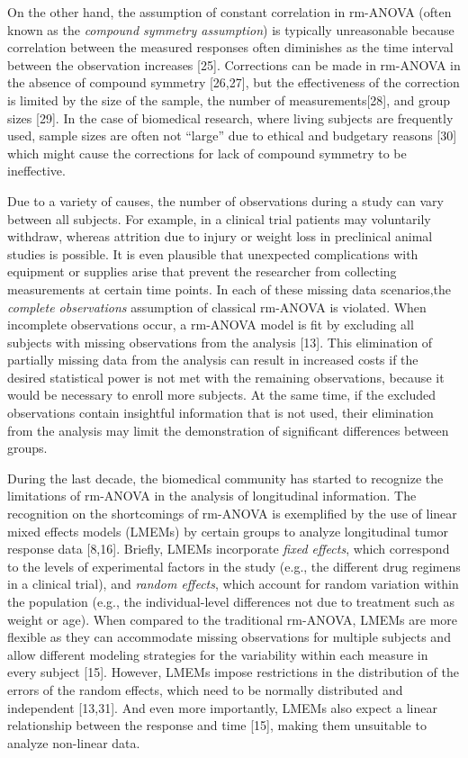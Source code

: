\documentclass[
]{article}
\begin{document}
On the other hand, the assumption of constant correlation in rm-ANOVA (often known as the \emph{compound symmetry assumption}) is typically unreasonable because correlation between the measured responses often diminishes as the time interval between the observation increases {[}25{]}. Corrections can be made in rm-ANOVA in the absence of compound symmetry {[}26,27{]}, but the effectiveness of the correction is limited by the size of the sample, the number of measurements{[}28{]}, and group sizes {[}29{]}. In the case of biomedical research, where living subjects are frequently used, sample sizes are often not ``large'' due to ethical and budgetary reasons {[}30{]} which might cause the corrections for lack of compound symmetry to be ineffective.

Due to a variety of causes, the number of observations during a study can vary between all subjects. For example, in a clinical trial patients may voluntarily withdraw, whereas attrition due to injury or weight loss in preclinical animal studies is possible. It is even plausible that unexpected complications with equipment or supplies arise that prevent the researcher from collecting measurements at certain time points. In each of these missing data scenarios,the \emph{complete observations} assumption of classical rm-ANOVA is violated. When incomplete observations occur, a rm-ANOVA model is fit by excluding all subjects with missing observations from the analysis {[}13{]}. This elimination of partially missing data from the analysis can result in increased costs if the desired statistical power is not met with the remaining observations, because it would be necessary to enroll more subjects. At the same time, if the excluded observations contain insightful information that is not used, their elimination from the analysis may limit the demonstration of significant differences between groups.

During the last decade, the biomedical community has started to recognize the limitations of rm-ANOVA in the analysis of longitudinal information. The recognition on the shortcomings of rm-ANOVA is exemplified by the use of linear mixed effects models (LMEMs) by certain groups to analyze longitudinal tumor response data {[}8,16{]}. Briefly, LMEMs incorporate \emph{fixed effects}, which correspond to the levels of experimental factors in the study (e.g., the different drug regimens in a clinical trial), and \emph{random effects}, which account for random variation within the population (e.g., the individual-level differences not due to treatment such as weight or age). When compared to the traditional rm-ANOVA, LMEMs are more flexible as they can accommodate missing observations for multiple subjects and allow different modeling strategies for the variability within each measure in every subject {[}15{]}. However, LMEMs impose restrictions in the distribution of the errors of the random effects, which need to be normally distributed and independent {[}13,31{]}. And even more importantly, LMEMs also expect a linear relationship between the response and time {[}15{]}, making them unsuitable to analyze non-linear data.
\end{document}
